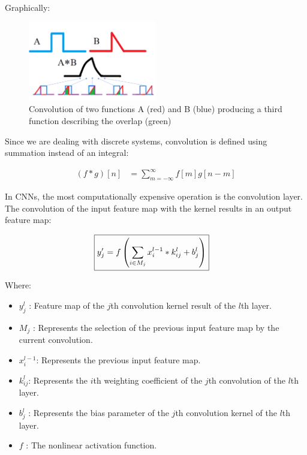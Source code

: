 \documentclass{article}
\begin{document}
Graphically:
\begin{figure}[H]
  \begin{center}
    \includegraphics[width=0.5\textwidth]{figures/math_con}
  \end{center}
  \caption{Convolution of two functions A (red) and B (blue) producing a third function describing the overlap (green)}\label{fig:convolution}
\end{figure}

Since we are dealing with discrete systems, convolution is defined using summation instead of an integral:

\begin{align*}
  \left( f * g \right) \left[ n \right] &= \sum_{m = -\infty}^{\infty} f \left[ m\right] g \left[ n-m \right]
\end{align*}

In CNNs, the most computationally expensive operation is the convolution layer. The convolution of the input feature map with the kernel results in an output feature map:

\begin{align*}
  \Aboxed{  y'_j = f \left( \sum_{i \in M_j}^{} x^{l-1}_{i}  * k^l_{ij} + b^l_{j}\right)}
\end{align*}

Where:
\begin{itemize}
  \item \( y^{l}_j \) : Feature map of the \( j \)th convolution kernel result of the \( l  \)th layer.
  \item \( M_{j} \) : Represents the selection of the previous input feature map by the current convolution.
  \item \( x_{i }^{l-1} \): Represents the previous input feature map.
  \item \( k_{ij}^l  \): Represents the \( i  \)th weighting coefficient of the \( j  \)th convolution of the \( l  \)th layer.
  \item \( b^{l }_j \) : Represents the bias parameter of the \( j  \)th convolution kernel of the \( l  \)th layer.
  \item \( f \) : The nonlinear activation function.
\end{itemize}
\end{document}
